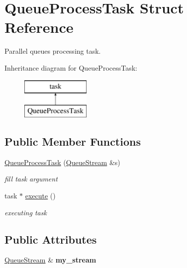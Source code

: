 \hypertarget{structQueueProcessTask}{}\section{Queue\+Process\+Task Struct Reference}
\label{structQueueProcessTask}


Parallel queue\textquotesingle{}s processing task.  


Inheritance diagram for Queue\+Process\+Task\+:\begin{figure}[H]
\begin{center}
\leavevmode
\includegraphics[height=2.000000cm]{structQueueProcessTask}
\end{center}
\end{figure}
\subsection*{Public Member Functions}
\begin{DoxyCompactItemize}
\item 
\hypertarget{structQueueProcessTask_aff067232e7e2e389159ee5e6dfa87f09}{}\hyperlink{structQueueProcessTask_aff067232e7e2e389159ee5e6dfa87f09}{Queue\+Process\+Task} (\hyperlink{structQueueStream}{Queue\+Stream} \&s)\label{structQueueProcessTask_aff067232e7e2e389159ee5e6dfa87f09}

\begin{DoxyCompactList}\small\item\em fill task argument \end{DoxyCompactList}\item 
\hypertarget{structQueueProcessTask_a8fb1eff44d9370a3eb21699f5f347793}{}task $\ast$ \hyperlink{structQueueProcessTask_a8fb1eff44d9370a3eb21699f5f347793}{execute} ()\label{structQueueProcessTask_a8fb1eff44d9370a3eb21699f5f347793}

\begin{DoxyCompactList}\small\item\em executing task \end{DoxyCompactList}\end{DoxyCompactItemize}
\subsection*{Public Attributes}
\begin{DoxyCompactItemize}
\item 
\hypertarget{structQueueProcessTask_a04e3ba76d90751de4061685e0eef5357}{}\hyperlink{structQueueStream}{Queue\+Stream} \& {\bfseries my\+\_\+stream}\label{structQueueProcessTask_a04e3ba76d90751de4061685e0eef5357}

\end{DoxyCompactItemize}


